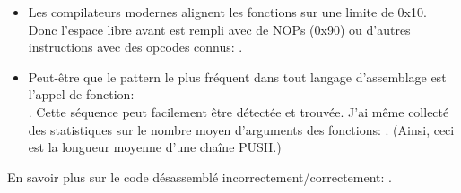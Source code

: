 \begin{itemize}

\item Les compilateurs modernes alignent les fonctions sur une limite de 0x10.
Donc l'espace libre avant est rempli avec de NOPs (0x90) ou d'autres instructions
avec des opcodes connus: .

\item Peut-être que le pattern le plus fréquent dans tout langage d'assemblage est
l'appel de fonction:\\
.
Cette séquence peut facilement être détectée et trouvée.
J'ai même collecté des statistiques sur le nombre moyen d'arguments des fonctions: .
(Ainsi, ceci est la longueur moyenne d'une chaîne PUSH.)

\end{itemize}

En savoir plus sur le code désassemblé incorrectement/correctement: .

